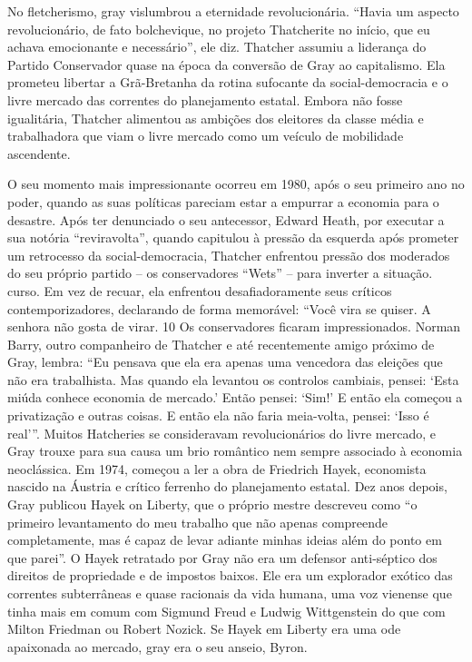 \par
 
No fletcherismo, gray vislumbrou a eternidade revolucionária. “Havia um aspecto revolucionário, de fato bolchevique, no projeto Thatcherite no início, que eu achava emocionante e necessário”, ele diz. Thatcher assumiu a liderança do Partido Conservador quase na época da conversão de Gray ao capitalismo. Ela prometeu libertar a Grã-Bretanha da rotina sufocante da social-democracia e o livre mercado das correntes do planejamento estatal. Embora não fosse igualitária, Thatcher alimentou as ambições dos eleitores da classe média e trabalhadora que viam o livre mercado como um veículo de mobilidade ascendente.
 
\par
 
O seu momento mais impressionante ocorreu em 1980, após o seu primeiro ano no poder, quando as suas políticas pareciam estar a empurrar a economia para o desastre. Após ter denunciado o seu antecessor, Edward Heath, por executar a sua notória “reviravolta”, quando capitulou à pressão da esquerda após prometer um retrocesso da social-democracia, Thatcher enfrentou pressão dos moderados do seu próprio partido – os conservadores “Wets” – para inverter a situação. curso. Em vez de recuar, ela enfrentou desafiadoramente seus críticos contemporizadores, declarando de forma memorável: “Você vira se quiser. A senhora não gosta de virar.
 {\color{blue} 10}  
Os conservadores ficaram impressionados. Norman Barry, outro companheiro de Thatcher e até recentemente amigo próximo de Gray, lembra: “Eu pensava que ela era apenas uma vencedora das eleições que não era trabalhista. Mas quando ela levantou os controlos cambiais, pensei: ‘Esta miúda conhece economia de mercado.’ Então pensei: ‘Sim!’ E então ela começou a privatização e outras coisas. E então ela não faria meia-volta, pensei: ‘Isso é real’”. Muitos Hatcheries se consideravam revolucionários do livre mercado, e Gray trouxe para sua causa um brio romântico nem sempre associado à economia neoclássica. Em 1974, começou a ler a obra de Friedrich Hayek, economista nascido na Áustria e crítico ferrenho do planejamento estatal. Dez anos depois, Gray publicou Hayek on Liberty, que o próprio mestre descreveu como “o primeiro levantamento do meu trabalho que não apenas compreende completamente, mas é capaz de levar adiante minhas ideias além do ponto em que parei”. O Hayek retratado por Gray não era um defensor anti-séptico dos direitos de propriedade e de impostos baixos. Ele era um explorador exótico das correntes subterrâneas e quase racionais da vida humana, uma voz vienense que tinha mais em comum com Sigmund Freud e Ludwig Wittgenstein do que com Milton Friedman ou Robert Nozick. Se Hayek em Liberty era uma ode apaixonada ao mercado, gray era o seu anseio, Byron.
 
